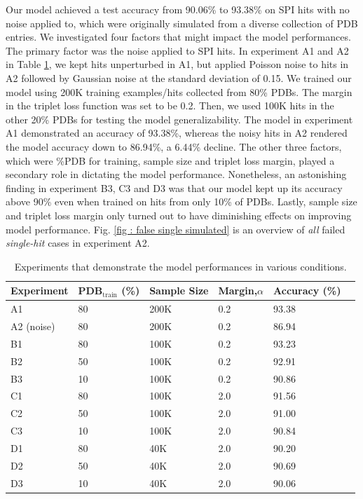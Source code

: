 Our model achieved a test accuracy from 90.06\% to 93.38\% on SPI hits with no
noise applied to, which were originally simulated from a diverse collection of
PDB entries.  We investigated four factors that might impact the model
performances.  The primary factor was the noise applied to SPI hits.  In
experiment A1 and A2 in Table \ref{tb : simulated performance}, we kept hits
unperturbed in A1, but applied Poisson noise to hits in A2 followed by Gaussian
noise at the standard deviation of 0.15.  We trained our model using 200K
training examples/hits collected from 80\% PDBs.  The margin in the triplet loss
function was set to be 0.2.  Then, we used 100K hits in the other 20\% PDBs for
testing the model generalizability.  The model in experiment A1 demonstrated an
accuracy of 93.38\%, whereas the noisy hits in A2 rendered the model accuracy
down to 86.94\%, a 6.44\% decline.  The other three factors, which were \%PDB
for training, sample size and triplet loss margin, played a secondary role in
dictating the model performance.  Nonetheless, an astonishing finding in
experiment B3, C3 and D3 was that our model kept up its accuracy above 90\% even
when trained on hits from only 10\% of PDBs.  Lastly, sample size and triplet
loss margin only turned out to have diminishing effects on improving model
performance.  Fig.  \ref{fig : false single simulated} is an overview of
\textit{all} failed \textit{single-hit} cases in experiment A2.


\begin{table}
    \caption{Experiments that demonstrate the model performances in various
    conditions.}
    \label{tb : simulated performance}
    \begin{tabularx}{\linewidth}{ l | X X X X X }
        Experiment  &
        PDB$_{\text{train}}$ (\%) &
        Sample Size &
        Margin,$\alpha$ &
        Accuracy (\%) \\
        \hline
        A1  & 80 & 200K &  0.2 & 93.38 \\
        A2 (noise)  & 80 & 200K &  0.2 & 86.94 \\
        \hline
        B1  & 80 & 100K &  0.2 & 93.23 \\
        B2  & 50 & 100K &  0.2 & 92.91 \\
        B3  & 10 & 100K &  0.2 & 90.86 \\
        \hline
        C1  & 80 & 100K &  2.0 & 91.56 \\
        C2  & 50 & 100K &  2.0 & 91.00 \\
        C3  & 10 & 100K &  2.0 & 90.84 \\
        \hline
        D1  & 80 & 40K  &  2.0 & 90.20 \\
        D2  & 50 & 40K  &  2.0 & 90.69 \\
        D3  & 10 & 40K  &  2.0 & 90.06 \\
    \end{tabularx}
\end{table}


